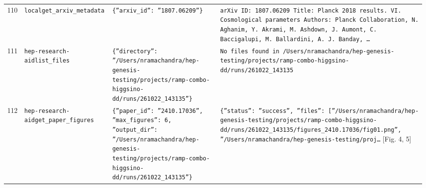 \documentclass[11pt,a4paper]{article}
\begin{document}
\begin{longtable}{@{}p{}p{}p{}p{}@{}}
110 & \texttt{local}\newline\texttt{get\_\allowbreak{}arxiv\_\allowbreak{}metadata} & \texttt{\{''arxiv\_\allowbreak{}id'':\allowbreak{} ''1807.06209''\}\allowbreak{}} & \texttt{arXiv ID:\allowbreak{} 1807.06209 Title:\allowbreak{} Planck 2018 results. VI. Cosmological parameters Authors:\allowbreak{}  Planck Collaboration,\allowbreak{} N. Aghanim,\allowbreak{} Y. Akrami,\allowbreak{} M. Ashdown,\allowbreak{} J. Aumont,\allowbreak{} C. Baccigalupi,\allowbreak{} M. Ballardini,\allowbreak{} A. J. Banday,\allowbreak{} \ldots{}\allowbreak{}} \\
111 & \texttt{hep-research-aid}\newline\texttt{list\_\allowbreak{}files} & \texttt{\{''directory'':\allowbreak{} ''/\allowbreak{}Users/\allowbreak{}nramachandra/\allowbreak{}hep-genesis-testing/\allowbreak{}projects/\allowbreak{}ramp-combo-higgsino-dd/\allowbreak{}runs/\allowbreak{}261022\_\allowbreak{}143135''\}\allowbreak{}} & \texttt{No files found in /\allowbreak{}Users/\allowbreak{}nramachandra/\allowbreak{}hep-genesis-testing/\allowbreak{}projects/\allowbreak{}ramp-combo-higgsino-dd/\allowbreak{}runs/\allowbreak{}261022\_\allowbreak{}143135} \\
112 & \texttt{hep-research-aid}\newline\texttt{get\_\allowbreak{}paper\_\allowbreak{}figures} & \texttt{\{''paper\_\allowbreak{}id'':\allowbreak{} ''2410.17036'',\allowbreak{} ''max\_\allowbreak{}figures'':\allowbreak{} 6,\allowbreak{} ''output\_\allowbreak{}dir'':\allowbreak{} ''/\allowbreak{}Users/\allowbreak{}nramachandra/\allowbreak{}hep-genesis-testing/\allowbreak{}projects/\allowbreak{}ramp-combo-higgsino-dd/\allowbreak{}runs/\allowbreak{}261022\_\allowbreak{}143135''\}\allowbreak{}} & \texttt{\{''status'':\allowbreak{} ''success'',\allowbreak{} ''files'':\allowbreak{} [''/\allowbreak{}Users/\allowbreak{}nramachandra/\allowbreak{}hep-genesis-testing/\allowbreak{}projects/\allowbreak{}ramp-combo-higgsino-dd/\allowbreak{}runs/\allowbreak{}261022\_\allowbreak{}143135/\allowbreak{}figures\_\allowbreak{}2410.17036/\allowbreak{}fig01.png'',\allowbreak{} ''/\allowbreak{}Users/\allowbreak{}nramachandra/\allowbreak{}hep-genesis-testing/\allowbreak{}proj\ldots{}\allowbreak{}} [Fig. 4, 5] \\

\end{longtable}
\end{document}
